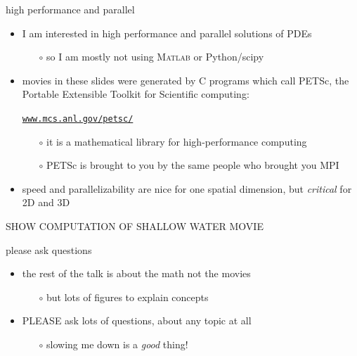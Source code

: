 \documentclass[10pt,hyperref,dvipsnames]{beamer}
\newcommand{\Matlab}{\textsc{Matlab}\xspace}
\begin{document}
\begin{frame}{high performance and parallel}

\begin{itemize}
\item I am interested in high performance and parallel solutions of PDEs
    \begin{itemize}
    \item[$\circ$] so I am mostly not using \Matlab or Python/scipy
    \end{itemize}
\item movies in these slides were generated by C programs which call PETSc, the Portable Extensible Toolkit for Scientific computing:

    \begin{center}
    \href{https://www.mcs.anl.gov/petsc/}{\texttt{www.mcs.anl.gov/petsc/}}
    \end{center}

    \begin{itemize}
    \item[$\circ$] it is a mathematical library for high-performance computing
    \item[$\circ$] PETSc is brought to you by the same people who brought you MPI
    \end{itemize}
\item speed and parallelizability are nice for one spatial dimension, but \emph{critical} for 2D and 3D
\end{itemize}

\vspace{10mm}
\begin{center}
\alert{SHOW COMPUTATION OF SHALLOW WATER MOVIE}
\end{center}

\end{frame}


\begin{frame}{please ask questions}

\begin{itemize}
\item the rest of the talk is about the math not the movies
    \begin{itemize}
    \item[$\circ$] but lots of figures to explain concepts
    \end{itemize}
\item \alert{PLEASE} ask lots of questions, about any topic at all
    \begin{itemize}
    \item[$\circ$] slowing me down is a \emph{good} thing!
    \end{itemize}
\end{itemize}
\end{frame}
\end{document}
